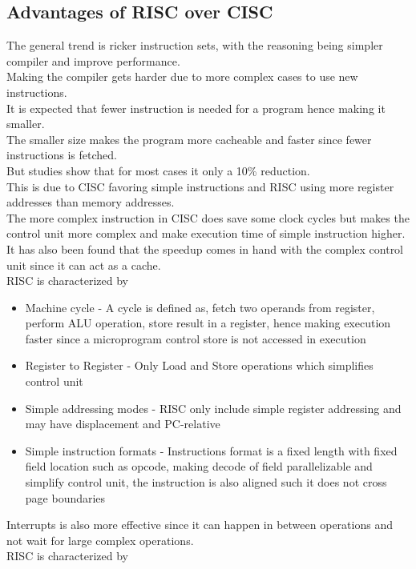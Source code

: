 \documentclass[12pt, a4paper]{article}
\begin{document}
		\subsection{Advantages of RISC over CISC}
			The general trend is ricker instruction sets, with the reasoning being simpler compiler and improve performance.\\
			Making the compiler gets harder due to more complex cases to use new instructions.\\
			It is expected that fewer instruction is needed for a program hence making it smaller.\\
			The smaller size makes the program more cacheable and faster since fewer instructions is fetched.\\
			But studies show that for most cases it only a 10\% reduction.\\
			This is due to CISC favoring simple instructions and RISC using more register addresses than memory addresses.\\
			The more complex instruction in CISC does save some clock cycles but makes the control unit more complex and make execution time of simple instruction higher.\\
			It has also been found that the speedup comes in hand with the complex control unit since it can act as a cache.\\
			RISC is characterized by
			\begin{itemize}
				\item Machine cycle - A cycle is defined as, fetch two operands from register, perform ALU operation, store result in a register, hence making execution faster since a microprogram control store is not accessed in execution
				\item Register to Register - Only Load and Store operations which simplifies control unit
				\item Simple addressing modes - RISC only include simple register addressing and may have displacement and PC-relative
				\item Simple instruction formats - Instructions format is a fixed length with fixed field location such as opcode, making decode of field parallelizable and simplify control unit, the instruction is also aligned such it does not cross page boundaries
			\end{itemize}
			Interrupts is also more effective since it can happen in between operations and not wait for large complex operations.\\
			RISC is characterized by
\end{document}
